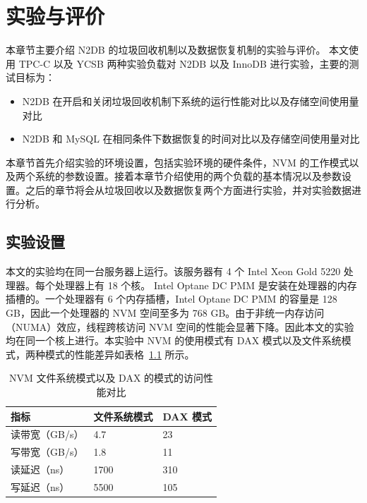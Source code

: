 
\chapter{实验与评价}

本章节主要介绍 N2DB 的垃圾回收机制以及数据恢复机制的实验与评价。
本文使用 TPC-C 以及 YCSB 两种实验负载对 N2DB 以及 InnoDB 进行实验，主要的测试目标为：
\begin{itemize}
    \item N2DB 在开启和关闭垃圾回收机制下系统的运行性能对比以及存储空间使用量对比
    \item N2DB 和 MySQL 在相同条件下数据恢复的时间对比以及存储空间使用量对比
\end{itemize}

本章节首先介绍实验的环境设置，包括实验环境的硬件条件，NVM 的工作模式以及两个系统的参数设置。接着本章节介绍使用的两个负载的基本情况以及参数设置。之后的章节将会从垃圾回收以及数据恢复两个方面进行实验，并对实验数据进行分析。

\section{实验设置}

本文的实验均在同一台服务器上运行。该服务器有 4 个 Intel Xeon Gold 5220 处理器。每个处理器上有 18 个核。
Intel Optane DC PMM 是安装在处理器的内存插槽的。一个处理器有 6 个内存插槽，Intel Optane DC PMM 的容量是 128 GB，因此一个处理器的 NVM 空间至多为 768 GB。由于非统一内存访问（NUMA）效应，线程跨核访问 NVM 空间的性能会显著下降。因此本文的实验均在同一个核上进行。本实验中 NVM 的使用模式有 DAX 模式以及文件系统模式，两种模式的性能差异如表格~\ref{tab:nvm-metric} 所示。

\begin{table}
    \centering
    \caption{NVM 文件系统模式以及 DAX 的模式的访问性能对比}
    \begin{tabular}{lll}
        \toprule
        指标           & 文件系统模式 & DAX 模式 \\
        \midrule
        读带宽（GB/s） & 4.7          & 23       \\
        写带宽（GB/s） & 1.8          & 11       \\
        读延迟（ns）   & 1700         & 310      \\
        写延迟（ns）   & 5500         & 105      \\
        \bottomrule
    \end{tabular}
    \label{tab:nvm-metric}
\end{table}

